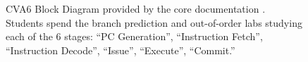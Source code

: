 
\begin{figure}[t]
    \centering
    \caption[
        CVA6 Block Diagram
    ]{
        CVA6 Block Diagram provided by the core documentation \cite{cva6}. Students spend the branch prediction and out-of-order labs studying each of the 6 stages: ``PC Generation'', ``Instruction Fetch'', ``Instruction Decode'', ``Issue'', ``Execute'', ``Commit.''
    }
    \label{fig:cva6_overview}
\end{figure}
